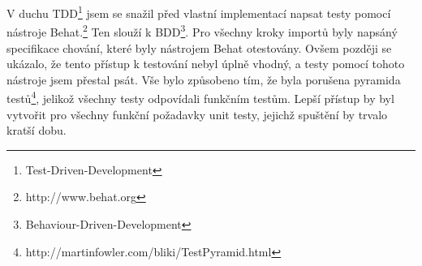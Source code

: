 V duchu TDD\footnote{Test-Driven-Development}
  jsem se snažil před vlastní implementací napsat testy pomocí nástroje Behat.\footnote{http://www.behat.org}
Ten slouží k BDD\footnote{Behaviour-Driven-Development}.
Pro všechny kroky importů byly napsáný specifikace chování, které byly nástrojem Behat otestovány.
Ovšem později se ukázalo, že tento přístup k testování nebyl úplně vhodný, a testy pomocí tohoto nástroje jsem přestal psát.
Vše bylo způsobeno tím, že byla porušena pyramida testů\footnote{http://martinfowler.com/bliki/TestPyramid.html},
  jelikož všechny testy odpovídali funkčním testům.
Lepší přístup by byl vytvořit pro všechny funkční požadavky unit testy,
  jejichž spuštění by trvalo kratší dobu.
